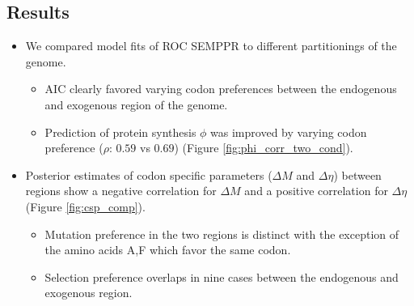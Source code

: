 \documentclass[12pt]{article}
\begin{document}
\subsection*{Results}

\begin{itemize}
	\item We compared model fits of ROC SEMPPR to different partitionings of the \kluyveri genome. %
	\begin{itemize}
		\item AIC clearly favored varying codon preferences between the endogenous and exogenous region of the \kluyveri genome.
		\item Prediction of protein synthesis $\phi$ was improved by varying codon preference ($\rho$: $0.59$ vs $0.69$) (Figure \ref{fig:phi_corr_two_cond}).
	\end{itemize}
	\item Posterior estimates of codon specific parameters ($\Delta M$ and $\Delta \eta$) between regions show a negative correlation for $\Delta M$ and a positive correlation for $\Delta \eta$ (Figure  \ref{fig:csp_comp}).
	\begin{itemize}
		\item Mutation preference in the two regions is distinct with the exception of the amino acids A,F which favor the same codon.
		\item Selection preference overlaps in nine cases between the endogenous and exogenous region.%

\end{itemize}
\end{itemize}
\end{document}
